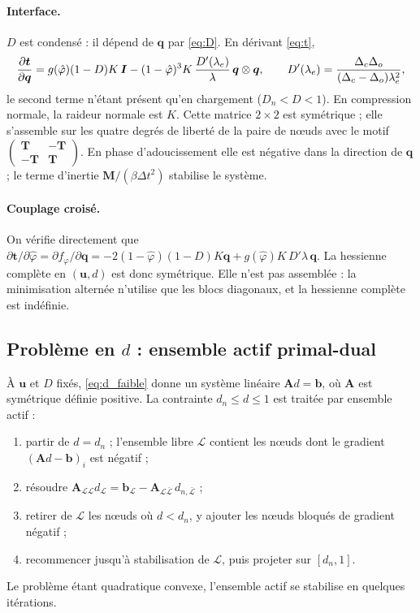 \documentclass[11pt,a4paper]{article}
\newcommand{\bu}{\bm{u}}\newcommand{\bq}{\bm{q}}\newcommand{\bt}{\bm{t}}
\newcommand{\phib}{\hat\varphi}
\begin{document}
\paragraph{Interface.} $D$ est condensé : il dépend de $\bq$ par \eqref{eq:D}. En dérivant \eqref{eq:t},
\begin{equation}
\frac{\partial\bt}{\partial\bq}=g(\phib)(1-D)K\,\bm{I}-(1-\phib)^3K\,\frac{D'(\lambda_e)}{\lambda}\,\bq\otimes\bq,
\qquad D'(\lambda_e)=\frac{\Dc\Do}{(\Dc-\Do)\lambda_e^2},
\label{eq:Kczm}
\end{equation}
le second terme n'étant présent qu'en chargement ($D_n<D<1$). En compression normale, la raideur normale
est $K$. Cette matrice $2\times2$ est symétrique ; elle s'assemble sur les quatre degrés de liberté de la
paire de nœuds avec le motif $\begin{pmatrix}\bm{T}&-\bm{T}\\-\bm{T}&\bm{T}\end{pmatrix}$. En phase
d'adoucissement elle est négative dans la direction de $\bq$ ; le terme d'inertie
$\bm{M}/(\beta\Delta t^2)$ stabilise le système.

\paragraph{Couplage croisé.} On vérifie directement que
$\partial\bt/\partial\phib=\partial f_\varphi/\partial\bq=-2(1-\phib)(1-D)K\bq+g(\phib)K\,D'\lambda\,\bq$.
La hessienne complète en $(\bu,d)$ est donc symétrique. Elle n'est pas assemblée : la minimisation
alternée n'utilise que les blocs diagonaux, et la hessienne complète est indéfinie.

\subsection{Problème en $d$ : ensemble actif primal-dual}\label{sec:pdas}
À $\bu$ et $D$ fixés, \eqref{eq:d_faible} donne un système linéaire $\bm{A}d=\bm{b}$, où $\bm{A}$ est
symétrique définie positive. La contrainte $d_n\le d\le 1$ est traitée par ensemble actif :
\begin{enumerate}
\item partir de $d=d_n$ ; l'ensemble libre $\mathcal{L}$ contient les nœuds dont le gradient
$(\bm{A}d-\bm{b})_i$ est négatif ;
\item résoudre $\bm{A}_{\mathcal{LL}}d_{\mathcal{L}}=\bm{b}_{\mathcal{L}}-\bm{A}_{\mathcal{L}\bar{\mathcal{L}}}\,d_{n,\bar{\mathcal{L}}}$ ;
\item retirer de $\mathcal{L}$ les nœuds où $d<d_n$, y ajouter les nœuds bloqués de gradient négatif ;
\item recommencer jusqu'à stabilisation de $\mathcal{L}$, puis projeter sur $[d_n,1]$.
\end{enumerate}
Le problème étant quadratique convexe, l'ensemble actif se stabilise en quelques itérations.
\end{document}
